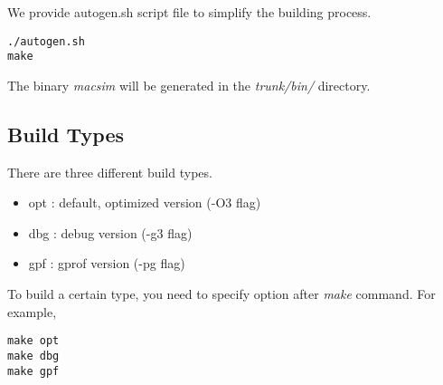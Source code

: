 We provide autogen.sh script file to simplify the building process.

\smallskip
\begin{lstlisting}
./autogen.sh
make
\end{lstlisting}
\smallskip

The binary \textit{macsim} will be generated in the
\textit{trunk/bin/} directory.


\subsection{Build Types}

There are three different build types.

\begin{itemize}
  \item opt : default, optimized version (-O3 flag)
  \item dbg : debug version (-g3 flag)
  \item gpf : gprof version (-pg flag)
\end{itemize}

To build a certain type, you need to specify option after \textit{make} command. For example, 

\smallskip
\begin{lstlisting}
make opt
make dbg
make gpf
\end{lstlisting}
\smallskip
